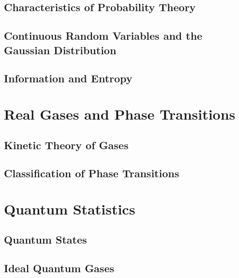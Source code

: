 \documentclass[12pt, a4paper, oneside, openright, titlepage]{book}
\begin{document}
\chapter{Characteristics of Probability Theory}


\chapter{Continuous Random Variables and the Gaussian Distribution}


\chapter{Information and Entropy}





\part{Real Gases and Phase Transitions}


\chapter{Kinetic Theory of Gases}



\chapter{Classification of Phase Transitions}






\part{Quantum Statistics}


\chapter{Quantum States}


\chapter{Ideal Quantum Gases}








\begin{appendices}


\end{appendices}
\end{document}
